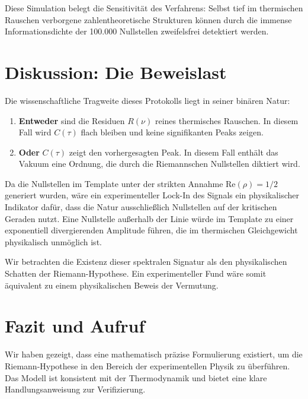 \documentclass[11pt, a4paper]{article}
\begin{document}
	Diese Simulation belegt die Sensitivität des Verfahrens: Selbst tief im thermischen Rauschen verborgene zahlentheoretische Strukturen können durch die immense Informationsdichte der 100.000 Nullstellen zweifelsfrei detektiert werden.
	
	\section{Diskussion: Die Beweislast}
	
	Die wissenschaftliche Tragweite dieses Protokolls liegt in seiner binären Natur:
	
	\begin{enumerate}
		\item \textbf{Entweder} sind die Residuen $R(\nu)$ reines thermisches Rauschen. In diesem Fall wird $C(\tau)$ flach bleiben und keine signifikanten Peaks zeigen.
		\item \textbf{Oder} $C(\tau)$ zeigt den vorhergesagten Peak. In diesem Fall enthält das Vakuum eine Ordnung, die durch die Riemannschen Nullstellen diktiert wird.
	\end{enumerate}
	
	Da die Nullstellen im Template unter der strikten Annahme $\text{Re}(\rho)=1/2$ generiert wurden, wäre ein experimenteller \glqq Lock-In\grqq{} des Signals ein physikalischer Indikator dafür, dass die Natur ausschließlich Nullstellen auf der kritischen Geraden \glqq nutzt\grqq. Eine Nullstelle außerhalb der Linie würde im Template zu einer exponentiell divergierenden Amplitude führen, die im thermischen Gleichgewicht physikalisch unmöglich ist.
	
	Wir betrachten die Existenz dieser spektralen Signatur als den physikalischen Schatten der Riemann-Hypothese. Ein experimenteller Fund wäre somit äquivalent zu einem physikalischen Beweis der Vermutung.
	
	\section{Fazit und Aufruf}
	
	Wir haben gezeigt, dass eine mathematisch präzise Formulierung existiert, um die Riemann-Hypothese in den Bereich der experimentellen Physik zu überführen. Das Modell ist konsistent mit der Thermodynamik und bietet eine klare Handlungsanweisung zur Verifizierung.
	
\end{document}
